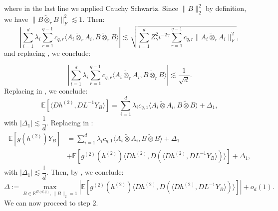 \documentclass[]{article}
\numberwithin{equation}{section}
\theoremstyle{definition}
\newcommand{\RR}{\mathbb{R}}
\newcommand{\EE}{\mathbb{E}}
\begin{document}
where in the last line we applied Cauchy Schwartz. Since $\| B\|^{2}_2$ by definition, we have $\| B\tilde{\otimes}_{r} B \|_{F}^{2} \lesssim 1$. Then: 
\begin{equation}
     \left |\sum_{i=1}^{d} \lambda_{i} \sum_{r=1}^{q-1} c_{q,r} \langle A_{i} \tilde{\otimes}_{r} A_{i}, B\tilde{\otimes}_{r} B \rangle \right |  \lesssim \sqrt{\sum_{i=1}^{d} Z_{\gamma}^{2}i^{-2\gamma}\sum_{r=1}^{q-1} c_{q,r} \| A_{i} \tilde{\otimes}_{r} A_{i}\|^{2}_{F}},
\end{equation}
and replacing , we conclude: 

\begin{equation}
    \left |\sum_{i=1}^{d} \lambda_{i} \sum_{r=1}^{q-1} c_{q,r} \langle A_{i} \tilde{\otimes}_{r} A_{i}, B\tilde{\otimes}_{r} B \rangle \right | \lesssim \dfrac{1}{\sqrt{d}}. 
\end{equation}
Replacing in , we conclude: 
\begin{equation}
    \EE \left [ \langle Dh^{(2)}, DL^{-1}Y_{B } \rangle \right ]   =\sum_{i=1}^{d} \lambda_{i} c_{q,1}\langle A_{i} \tilde{\otimes} A_{i}, B\tilde{\otimes} B \rangle+ \Delta_{1},
\end{equation}
with $| \Delta_{1}|\lesssim \dfrac{1}{d}$. Replacing in :
\begin{align}
     \EE\left[ g(h^{(2)}) Y_{B}\right ]   & =\sum_{i=1}^{d} \lambda_{i} c_{q,1}\langle A_{i} \tilde{\otimes} A_{i}, B\tilde{\otimes} B \rangle+ \Delta_{1} \\
    & +  \EE \left [ g^{(2)}(h^{(2)}) \langle Dh^{(2)}, D \left ( \langle Dh^{(2)}, DL^{-1}Y_{B}\rangle \right ) \rangle\right ] + \Delta_{1},
\end{align}
with $| \Delta_{1}|\lesssim \dfrac{1}{d}$. Then, by , we conclude:
\begin{equation}
     \Delta:=\max_{B \in \RR^{B(d,q)}, \| B\|_2 = 1} \left | \EE \left [ g^{(2)}(h^{(2)}) \langle Dh^{(2)}, D \left ( \langle Dh^{(2)}, DL^{-1}Y_{B}\rangle \right ) \rangle\right ]\right | +o_{d}(1).
     \label{eq:operator_norm_subtraction_2}
\end{equation}
We can now proceed to step 2.
\end{document}
